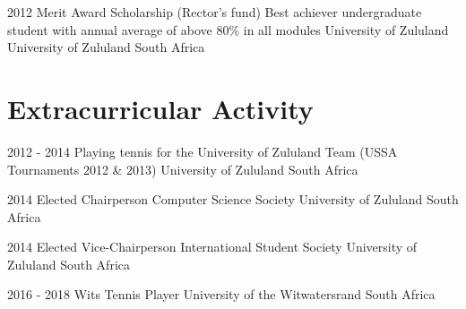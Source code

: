 \documentclass[letterpaper]{moderncv}        %
\begin{document}
\cventry
{2012}
{Merit Award Scholarship (Rector’s fund)}
{Best achiever undergraduate student with annual average of above 80\% in all modules}
{University of Zululand}
{University of Zululand}
{South Africa}
{}

\section{Extracurricular Activity}
\cventry
{2012 - 2014}
{Playing tennis for the University of Zululand Team (USSA Tournaments 2012 \& 2013)}
{University	of Zululand}
{South Africa}
{}
{}

\cventry
{2014}
{Elected Chairperson Computer Science Society}
{University	of Zululand}
{South Africa}
{}
{}

\cventry
{2014}
{Elected Vice-Chairperson International Student Society}
{University	of Zululand}
{South Africa}
{}
{}

\cventry
{2016 - 2018}
{Wits Tennis Player}
{University	of the Witwatersrand}
{South Africa}
{}
{}
\end{document}

